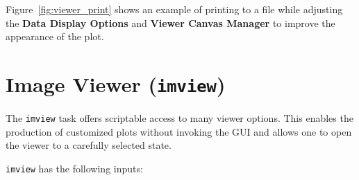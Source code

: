 Figure~\ref{fig:viewer_print} shows an example of printing to a file while
adjusting the {\bf Data Display Options} and {\bf Viewer Canvas Manager} to
improve the appearance of the plot.

\section{Image Viewer ({\tt imview})}
\label{section:display.imview}

The {\tt imview} task offers scriptable access to many viewer options.
This enables the production of customized plots without invoking the GUI 
and allows one to open the viewer to a carefully selected state.

{\tt imview} has the following inputs:

